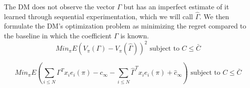 \documentclass[12pt,a4paper]{article}
\begin{document}
The DM does not observe the vector $\Gamma$ but has an imperfect estimate of it learned through sequential experimentation, which we will call $\hat \Gamma$. We then formulate the DM's optimization problem as minimizing the regret compared to the baseline in which the coefficient $\Gamma$ is known. \\

$$ Min_{\pi} E \left( V_\pi (\Gamma) - V_\pi (\hat \Gamma) \right)^2 \text{ subject to } C\leq \bar C $$


$$ Min_{\pi} E \left( \sum_{i \leq N} \Gamma^T x_i e_i(\pi) - c_\infty - \sum_{i \leq N} \hat \Gamma^T x_i e_i(\pi) + \hat c_\infty \right) \text{ subject to } C\leq \bar C $$
\end{document}
